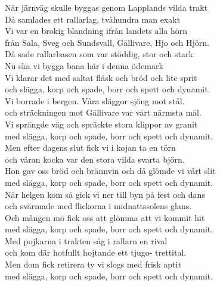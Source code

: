 \vspace{10pt}
När järnväg skulle byggas genom Lapplands vilda trakt\\
Då samlades ett rallarlag, tvåhundra man exakt\\
Vi var en brokig blandning ifrån landets alla hörn\\
från Sala, Sveg och Sundsvall, Gällivare, Hjo och Hjörn.\\
\vspace{10pt}
Då sade rallarbasen som var stöddig, stor och stark\\
Nu ska vi bygga bana här i denna ödemark\\
Vi klarar det med saltat fläsk och bröd och lite sprit\\
och slägga, korp och spade, borr och spett och dynamit.\\
\vspace{10pt}
Vi borrade i bergen. Våra släggor sjöng mot stål.\\
och sträckningen mot Gällivare var vårt närmsta mål.\\
Vi sprängde väg och spräckte stora klippor av granit\\
med slägga, korp och spade, borr och spett och dynamit.\\
\vspace{10pt}
Men efter dagens slut fick vi i kojan ta en törn\\
och våran kocka var den stora vilda svarta björn.\\
Hon gav oss bröd och brännvin och då glömde vi vårt slit\\
med slägga, korp och spade, borr och spett och dynamit.\\
\vspace{10pt}
När helgen kom så gick vi ner till byn på fest och dans\\
och svärmade med flickorna i midnattssolens glans.\\
Och mången mö fick oss att glömma att vi kommit hit\\
med slägga, korp och spade, borr och spett och dynamit.\\
\vspace{10pt}
Med pojkarna i trakten såg i rallarn en rival\\
och kom där hotfullt hojtande ett tjugo- trettital.\\
Men dom fick retirera ty vi slogs med frisk aptit\\
med slägga, korp och spade, borr och spett och dynamit.\\
